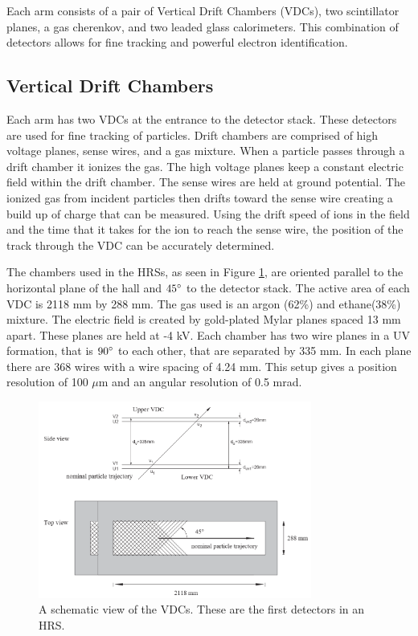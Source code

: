 Each arm consists of a pair of Vertical Drift Chambers (VDCs), two scintillator planes, a gas cherenkov, and two leaded glass calorimeters. This combination of detectors allows for fine tracking and powerful electron identification.

\subsection{Vertical Drift Chambers}

Each arm has two VDCs at the entrance to the detector stack. These detectors are used for fine tracking of particles. Drift chambers are comprised of high voltage planes, sense wires, and a gas mixture. When a particle passes through a drift chamber it ionizes the gas. The high voltage planes keep a constant electric field within the drift chamber. The sense wires are held at ground potential. The ionized gas from incident particles then drifts toward the sense wire creating a build up of charge that can be measured. Using the drift speed of ions in the field and the time that it takes for the ion to reach the sense wire, the position of the track through the VDC can be accurately determined.

The chambers used in the HRSs, as seen in Figure \ref{fig:vdcs}, are oriented parallel to the horizontal plane of the hall and $45\degree$ to the detector stack. The active area of each VDC is 2118 mm by 288 mm. The gas used is an argon (62\%) and ethane(38\%) mixture. The electric field is created by gold-plated Mylar planes spaced 13 mm apart. These planes are held at -4 kV. Each chamber has two wire planes in a UV formation, that is $90\degree$ to each other, that are separated by 335 mm. In each plane there are 368 wires with a wire spacing of 4.24 mm. This setup gives a position resolution of 100 $\mu$m and an angular resolution of 0.5 mrad.

\begin{figure}
\begin{center}
	\includegraphics[width=0.8\textwidth]{./setup/fig/vdc.png}
	\caption{A schematic view of the VDCs. These are the first detectors in an HRS.\cite{HANIM}}
	\label{fig:vdcs}
\end{center}
\end{figure}

